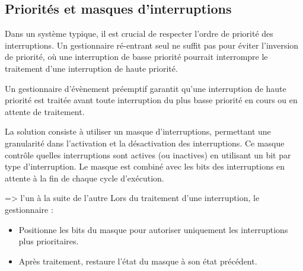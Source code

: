 \subsection{Priorités et masques d'interruptions}

Dans un système typique, il est crucial de respecter l'ordre de priorité des interruptions. 
Un gestionnaire ré-entrant seul ne suffit pas pour éviter l'inversion de priorité, où une interruption de basse priorité pourrait interrompre le traitement d'une interruption de haute priorité.

Un gestionnaire d’évènement préemptif garantit qu’une interruption de haute priorité est traitée avant toute interruption du plus basse priorité en cours ou en attente de traitement.

La solution consiste à utiliser un masque d'interruptions, permettant une granularité dans l'activation et la désactivation des interruptions. 
Ce masque contrôle quelles interruptions sont actives (ou inactives) en utilisant un bit par type d'interruption. 
Le masque est combiné avec les bits des interruptions en attente à la fin de chaque cycle d'exécution.

=> l'un à la suite de l'autre
Lors du traitement d'une interruption, le gestionnaire :
\begin{itemize}
    \item Positionne les bits du masque pour autoriser uniquement les interruptions plus prioritaires.
    \item Après traitement, restaure l'état du masque à son état précédent.
\end{itemize}

